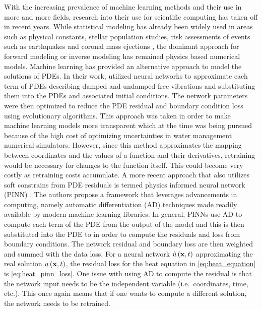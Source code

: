 With the increasing prevalence of machine learning methods and their use in more and more fields, research into their use for scientific computing has taken off in recent years. While statistical modeling has already been widely used in areas such as physical constants, stellar population studies, risk assessments of events such as earthquakes and coronal mass ejections \autocite{berlinerPhysicalStatisticalModeling2003,anselmoComputationalMethodsReentry2005,reinhardtAsteroidRiskAssessment2016,uzanFundamentalConstantsTheir2003,spanosWhereStatisticalModels2006,bernardiStellarPopulationAnalysis2022}, the dominant approach for forward modeling or inverse modeling has remained physics based numerical models. Machine learning has provided an alternative approach to model the solutions of PDEs. In their work, \textcite{aartsNeuralNetworkMethod2001} utilized neural networks to approximate each term of PDEs describing damped and undamped free vibrations and substituting them into the PDEs and associated initial conditions. The network parameters were then optimized to reduce the PDE residual and boundary condition loss using evolutionary algorithms. This approach was taken in order to make machine learning models more transparent which at the time was being pursued because of the high cost of optimizing uncertainties in water management numerical simulators. However, since this method approximates the mapping between coordinates and the values of a function and their derivatives, retraining would be necessary for changes to the function itself. This could become very costly as retraining costs accumulate. A more recent approach that also utilizes soft constrains from PDE residuals is termed physics informed neural network (PINN) \autocite{raissiPhysicsinformedNeuralNetworks2019}. The authors propose a framework that leverages advancements in computing, namely automatic differentiation (AD) techniques made readily available by modern machine learning libraries. In general, PINNs use AD to compute each term of the PDE from the output of the model and this is then substituted into the PDE to in order to compute the residuals and loss from boundary conditions. The network residual and boundary loss are then weighted and summed with the data loss. For a neural network \(\hat{u}\left(\vb{x},t\right)\) approximating the real solution \(u\left(\vb{x},t\right)\), the residual loss for the heat equation in \cref{eq:heat_equation} is \cref{eq:heat_pinn_loss}. One issue with using AD to compute the residual is that the network input needs to be the independent variable (i.e.\ coordinates, time, etc.). This once again means that if one wants to compute a different solution, the network needs to be retrained.
